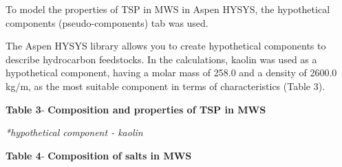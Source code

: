 To model the properties of TSP in MWS in Aspen HYSYS, the hypothetical
components (pseudo-components) tab was used.

The Aspen HYSYS library allows you to create hypothetical components to
describe hydrocarbon feedstocks. In the calculations, kaolin was used as
a hypothetical component, having a molar mass of 258.0 and a density of
2600.0 kg/m, as the most suitable component in terms
of characteristics (Table 3).

{\bfseries Table 3}- {\bfseries Composition and properties of TSP in MWS}


\emph{*hypothetical component - kaolin}

{\bfseries Table 4}- {\bfseries Composition of salts in MWS}


